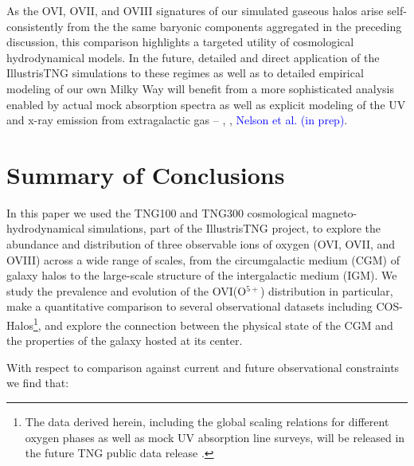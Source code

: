 \documentclass[useAMS,usenatbib]{mnras}
\newcommand{\ovi}{OVI\xspace}
\newcommand{\ovii}{OVII\xspace}
\newcommand{\oviii}{OVIII\xspace}
\begin{document}
As the \ovi, \ovii, and \oviii signatures of our simulated gaseous halos arise self-consistently from the the same baryonic components aggregated in the preceding discussion, this comparison highlights a targeted utility of cosmological hydrodynamical models. In the future, detailed and direct application of the IllustrisTNG simulations to these regimes as well as to detailed empirical modeling of our own Milky Way \citep{miller16} will benefit from a more sophisticated analysis enabled by actual mock absorption spectra \citep[e.g.][]{bird15,hummels17,liang18} as well as explicit modeling of the UV and x-ray emission from extragalactic gas -- \cite{bertone10a}, \cite{corlies16}, \textcolor{blue}{Nelson et al. (in prep)}.


\section{Summary of Conclusions} \label{sec_conclusions}

In this paper we used the TNG100 and TNG300 cosmological magneto-hydrodynamical simulations, part of the IllustrisTNG project, to explore the abundance and distribution of three observable ions of oxygen (\ovi, \ovii, and \oviii) across a wide range of scales, from the circumgalactic medium (CGM) of galaxy halos to the large-scale structure of the intergalactic medium (IGM). We study the prevalence and evolution of the \ovi (O$^{5+}$) distribution in particular, make a quantitative comparison to several observational datasets including COS-Halos\footnote{The data derived herein, including the global scaling relations for different oxygen phases as well as mock UV absorption line surveys, will be released in the future TNG public data release \citep[following][]{nelson15b}.}, and explore the connection between the physical state of the CGM and the properties of the galaxy hosted at its center.

With respect to comparison against current and future observational constraints we find that:
\end{document}
